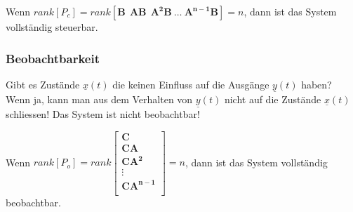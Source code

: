 Wenn $rank \left[P_{c}\right] = rank \left[ \boldsymbol{B~~AB~~ A^2B~\ldots~
A^{n-1}B} \right] = n $, dann ist das System vollständig steuerbar.


\subsubsection{Beobachtbarkeit }
Gibt es Zustände $\underline{x}(t)$ die keinen Einfluss auf die Ausgänge
$\underline{y}(t)$ haben? Wenn ja, kann man aus dem Verhalten von 
$\underline{y}(t)$ nicht auf die Zustände $\underline{x}(t)$ schliessen!
Das System ist nicht beobachtbar!


Wenn $rank \left[P_{o}\right] = rank \left[ \boldsymbol{
\begin{array}{c}
 C\\
 CA\\
CA^2\\
\vdots \\
CA^{n-1}\\
\end{array}} \right] = n$, dann ist das System vollständig
beobachtbar.


